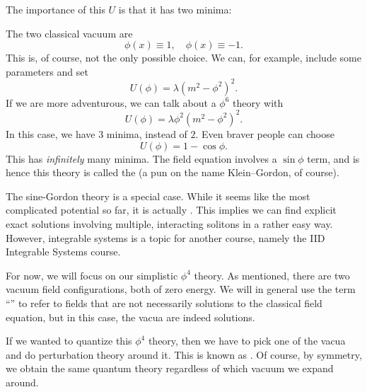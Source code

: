 \documentclass[a4paper]{article}
\begin{document}
The importance of this $U$ is that it has two minima:
\begin{center}
\end{center}
The two classical vacuum are
\[
  \phi(x) \equiv 1,\quad \phi(x) \equiv -1.
\]
This is, of course, not the only possible choice. We can, for example, include some parameters and set
\[
  U(\phi) = \lambda(m^2 - \phi^2)^2.
\]
If we are more adventurous, we can talk about a $\phi^6$ theory with
\[
  U(\phi) = \lambda \phi^2 (m^2 - \phi^2)^2.
\]
In this case, we have $3$ minima, instead of $2$. Even braver people can choose
\[
  U(\phi) = 1 - \cos \phi.
\]
This has \emph{infinitely} many minima. The field equation involves a $\sin \phi$ term, and is hence this theory is called the  (a pun on the name Klein--Gordon, of course).

The sine-Gordon theory is a special case. While it seems like the most complicated potential so far, it is actually . This implies we can find explicit exact solutions involving multiple, interacting solitons in a rather easy way. However, integrable systems is a topic for another course, namely the IID Integrable Systems course.

For now, we will focus on our simplistic $\phi^4$ theory. As mentioned, there are two vacuum field configurations, both of zero energy. We will in general use the term ``'' to refer to fields that are not necessarily solutions to the classical field equation, but in this case, the vacua are indeed solutions.

If we wanted to quantize this $\phi^4$ theory, then we have to pick one of the vacua and do perturbation theory around it. This is known as . Of course, by symmetry, we obtain the same quantum theory regardless of which vacuum we expand around.
\end{document}
